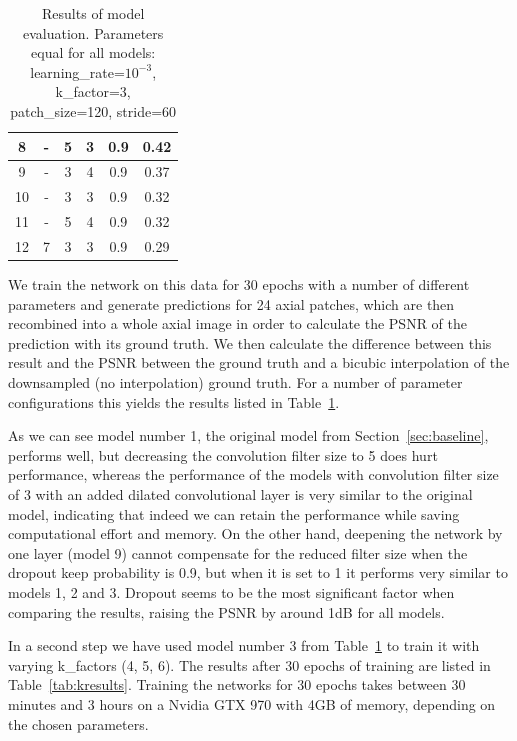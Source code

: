 \documentclass[a4paper, 12pt]{article} %
\begin{document}
\begin{table}[h]
\begin{tabular}{c | c | c | c | c | c}
\hline
 8  & -             & 5          & 3           & 0.9     & 0.42                                                                                   \\
\hline
 9  & -             & 3          & 4           & 0.9     & 0.37                                                                                   \\
\hline
10  & -             & 3          & 3           & 0.9     & 0.32                                                                                   \\
\hline
11  & -             & 5          & 4           & 0.9     & 0.32                                                                                   \\
\hline
12  & 7             & 3          & 3           & 0.9     & 0.29
\end{tabular}
\caption{Results of model evaluation. Parameters equal for all models: learning\_rate=$10^{-3}$, k\_factor=3, patch\_size=120, stride=60}
\label{tab:mresults}
\end{table}

We train the network on this data for 30 epochs with a number of different parameters and generate predictions for 24 axial patches, which are then recombined into a whole axial image in order to calculate the PSNR of the prediction with its ground truth. We then calculate the difference between this result and the PSNR between the ground truth and a bicubic interpolation of the downsampled (no interpolation) ground truth. For a number of parameter configurations this yields the results listed in Table~\ref{tab:mresults}.

As we can see model number 1, the original model from Section~\ref{sec:baseline}, performs well, but decreasing the convolution filter size to 5 does hurt performance, whereas the performance of the models with convolution filter size of 3 with an added dilated convolutional layer is very similar to the original model, indicating that indeed we can retain the performance while saving computational effort and memory. On the other hand, deepening the network by one layer (model 9) cannot compensate for the reduced filter size when the dropout keep probability is 0.9, but when it is set to 1 it performs very similar to models 1, 2 and 3. Dropout seems to be the most significant factor when comparing the results, raising the PSNR by around 1dB for all models.

In a second step we have used model number 3 from Table~\ref{tab:mresults} to train it with varying k\_factors (4, 5, 6). The results after 30 epochs of training are listed in Table~\ref{tab:kresults}. Training the networks for 30 epochs takes between 30 minutes and 3 hours on a Nvidia GTX 970 with 4GB of memory, depending on the chosen parameters.
\end{document}
